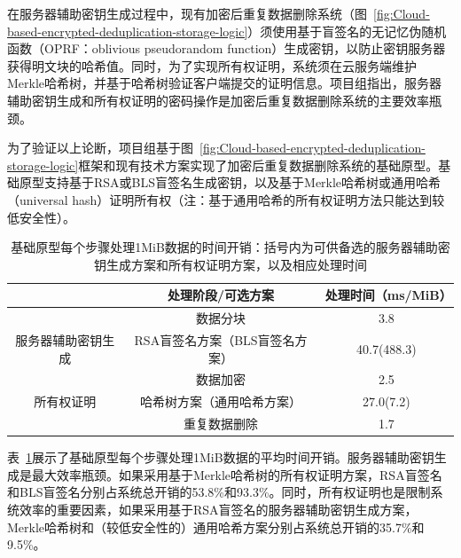 在服务器辅助密钥生成过程中，现有加密后重复数据删除系统（图~\ref{fig:Cloud-based-encrypted-deduplication-storage-logic}）须使用基于盲签名\cite{armknecht2015transparent,bellare2013DupLESS}的无记忆伪随机函数（OPRF：oblivious pseudorandom function）生成密钥\cite{bellare2013DupLESS}，以防止密钥服务器获得明文块的哈希值。同时，为了实现所有权证明，系统须在云服务端维护Merkle哈希树，并基于哈希树验证客户端提交的证明信息\cite{halevi2011proofs}。项目组指出，服务器辅助密钥生成和所有权证明的密码操作是加密后重复数据删除系统的主要效率瓶颈。

为了验证以上论断，项目组基于图~\ref{fig:Cloud-based-encrypted-deduplication-storage-logic}框架和现有技术方案实现了加密后重复数据删除系统的基础原型。基础原型支持基于RSA\cite{bellare2013DupLESS}或BLS\cite{armknecht2015transparent}盲签名生成密钥，以及基于Merkle哈希树\cite{halevi2011proofs}或通用哈希（universal hash）\cite{xu2013weak}证明所有权（注：基于通用哈希的所有权证明方法\cite{xu2013weak}只能达到较低安全性）。


\begin{table}[!htb]
    \small
    \centering
    \begin{tabular}{@{}ccc@{}}
    \toprule
                           & 处理阶段/可选方案          & 处理时间（ms/MiB） \\ \midrule
                           & 数据分块               & 3.8          \\
    服务器辅助密钥生成              & RSA盲签名方案（BLS盲签名方案） & 40.7(488.3)  \\
    \multirow{3}{*}{所有权证明} & 数据加密               & 2.5          \\
                           & 哈希树方案（通用哈希方案）      & 27.0(7.2)    \\
                           & 重复数据删除             & 1.7          \\ \bottomrule
    \end{tabular}
    \caption{基础原型每个步骤处理1MiB数据的时间开销：括号内为可供备选的服务器辅助密钥生成方案和所有权证明方案，以及相应处理时间}
    \label{tab:intro-bottleneck}
\end{table}

表~\ref{tab:intro-bottleneck}展示了基础原型每个步骤处理1MiB数据的平均时间开销。服务器辅助密钥生成是最大效率瓶颈。如果采用基于Merkle哈希树的所有权证明方案，RSA盲签名和BLS盲签名分别占系统总开销的53.8\%和93.3\%。同时，所有权证明也是限制系统效率的重要因素，如果采用基于RSA盲签名的服务器辅助密钥生成方案，Merkle哈希树和（较低安全性的）通用哈希方案分别占系统总开销的35.7\%和9.5\%。

